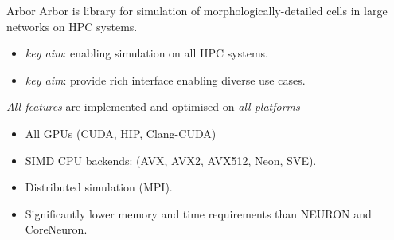 \documentclass[aspectratio=43]{beamer}
\newcommand{\arbor}{{\ttfamily Arbor}\xspace}
\newcommand{\neuron}{{\ttfamily NEURON}\xspace}
\begin{document}
\begin{frame}[fragile]{\arbor}
    \arbor is library for simulation of morphologically-detailed cells in large networks on HPC systems.
    \begin{itemize}
        \item \emph{key aim}: enabling simulation on all HPC systems.
        \item \emph{key aim}: provide rich interface enabling diverse use cases.
    \end{itemize}

    \vspace{10pt}
    \emph{All features} are implemented and optimised on \emph{all platforms}
    \begin{itemize}
        \item All GPUs (CUDA, HIP, Clang-CUDA)
        \item SIMD CPU backends: (AVX, AVX2, AVX512, Neon, SVE).
        \item Distributed simulation (MPI).
        \item Significantly lower memory and time requirements than \neuron and CoreNeuron.
    \end{itemize}
\end{frame}
\end{document}
